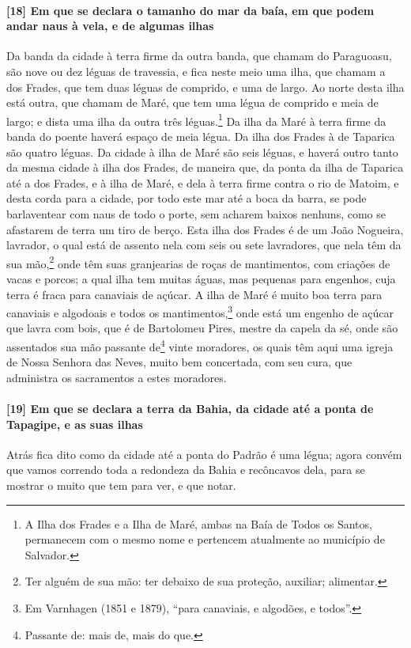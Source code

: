 \begin{linenumbers}
\paragraph{[18] Em que se declara o tamanho do mar da baía, em que podem andar naus à vela,
e de algumas ilhas}\quad
Da banda da cidade à terra firme da outra banda, que chamam do Paraguoasu, são nove ou dez
léguas de travessia, e fica neste meio uma ilha, que chamam a dos Frades, que tem duas
léguas de comprido, e uma de largo. Ao norte desta ilha está outra, que chamam de Maré,
que tem uma légua de comprido e meia de largo; e dista uma ilha da outra três
léguas.\footnote{ A Ilha dos Frades e a Ilha de Maré, ambas na Baía de Todos os Santos,
permanecem com o mesmo nome e pertencem atualmente ao município de Salvador.} Da ilha da
Maré à terra firme da banda do poente haverá espaço de meia légua. Da ilha dos Frades à de
Taparica são quatro léguas. Da cidade à ilha de Maré são seis léguas, e haverá outro tanto
da mesma cidade à ilha dos Frades, de maneira que, da ponta da ilha de Taparica até a dos
Frades, e à ilha de Maré, e dela à terra firme contra o rio de Matoim, e desta corda para
a cidade, por todo este mar até a boca da barra, se pode barlaventear com naus de todo o
porte, sem acharem baixos nenhuns, como se afastarem de terra um tiro de berço. Esta ilha
dos Frades é de um João Nogueira, lavrador, o qual está de assento nela com seis ou sete
lavradores, que nela têm da sua mão,\footnote{ Ter alguém de sua mão: ter debaixo de sua
proteção, auxiliar; alimentar.} onde têm suas granjearias de roças de mantimentos, com
criações de vacas e porcos; a qual ilha tem muitas águas, mas pequenas para engenhos, cuja
terra é fraca para canaviais de açúcar. A ilha de Maré é muito boa terra para canaviais e
algodoais e todos os mantimentos,\footnote{ Em Varnhagen (1851 e 1879), ``para canaviais,
e algodões, e todos''.} onde está um engenho de açúcar que lavra com bois, que é de
Bartolomeu Pires, mestre da capela da sé, onde são assentados sua mão passante
de\footnote{ Passante de: mais de, mais do que.} vinte moradores, os quais têm aqui uma
igreja de Nossa Senhora das Neves, muito bem concertada, com seu cura, que administra os
sacramentos a estes moradores.

\paragraph{[19] Em que se declara a terra da Bahia, da cidade até a ponta de Tapagipe, e as
suas ilhas}\quad
Atrás fica dito como da cidade até a ponta do Padrão é uma légua; agora convém que vamos
correndo toda a redondeza da Bahia e recôncavos dela, para se mostrar o muito que tem para
ver, e que notar.


\end{linenumbers}
